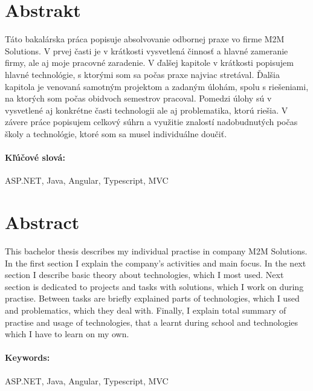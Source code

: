 \documentclass[11pt, oneside]{report}
\begin{document}
\newpage 
\section*{Abstrakt}


Táto bakalárska práca popisuje absolvovanie odbornej praxe vo firme M2M Solutions. V prvej časti je v krátkosti   vysvetlená činnosť a hlavné zameranie firmy, ale aj moje pracovné zaradenie. V ďalšej kapitole  v krátkosti popisujem  hlavné technológie, s ktorými som sa počas praxe najviac stretával. Ďalšia  kapitola je venovaná samotným projektom a zadaným úlohám,  spolu s riešeniami, na ktorých som  počas obidvoch semestrov pracoval. Pomedzi úlohy sú v vysvetlené aj konkrétne  časti technologii ale aj problematika, ktorú riešia. V závere práce popisujem  celkový súhrn  a využitie  znalostí  nadobudnutých počas školy a technológie, ktoré  som sa musel individuálne doučiť.



\paragraph*{Kľúčové slová:} ASP.NET, Java, Angular, Typescript, MVC

\paragraph*{}

\section*{Abstract}
This bachelor thesis describes my individual practise in company M2M Solutions. In the first section I explain the company's  activities and main focus. In the next section I describe basic theory about technologies, which I most used. Next section is dedicated to projects and tasks with solutions, which I work on during practise. Between tasks are briefly explained  parts of technologies, which  I used and problematics, which they deal with. Finally, I explain total summary of practise and usage of technologies, that a learnt during school and technologies which I have to learn on my own.


\paragraph*{Keywords:}  ASP.NET, Java, Angular, Typescript, MVC
\end{document}
